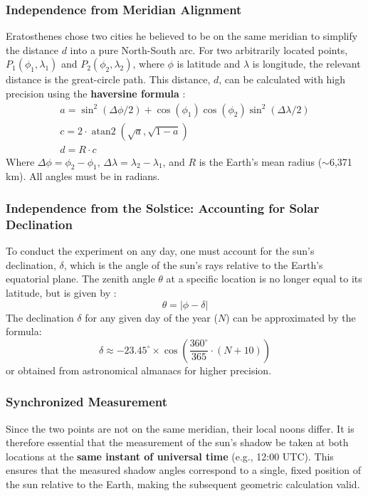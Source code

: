 \documentclass[11pt]{article}
\DeclareMathOperator{\atanS}{atan2}
\begin{document}
\subsubsection{Independence from Meridian Alignment}
Eratosthenes chose two cities he believed to be on the same meridian to simplify the distance $d$ into a pure North-South arc. For two arbitrarily located points, $P_1(\phi_1, \lambda_1)$ and $P_2(\phi_2, \lambda_2)$, where $\phi$ is latitude and $\lambda$ is longitude, the relevant distance is the great-circle path. This distance, $d$, can be calculated with high precision using the \textbf{haversine formula} \cite{Sinnott1984}:
\begin{gather}
    a = \sin^2(\Delta\phi/2) + \cos(\phi_1)\cos(\phi_2)\sin^2(\Delta\lambda/2) \label{eq:haversine_a} \\
    c = 2 \cdot \atanS(\sqrt{a}, \sqrt{1-a}) \label{eq:haversine_c} \\
    d = R \cdot c 
    \label{eq:haversine_d}
\end{gather}
Where $\Delta\phi = \phi_2 - \phi_1$, $\Delta\lambda = \lambda_2 - \lambda_1$, and $R$ is the Earth's mean radius ($\sim$6,371 km). All angles must be in radians.

\subsubsection{Independence from the Solstice: Accounting for Solar Declination}
To conduct the experiment on any day, one must account for the sun’s declination, $\delta$, which is the angle of the sun's rays relative to the Earth's equatorial plane. The zenith angle $\theta$ at a specific location is no longer equal to its latitude, but is given by \cite{Meeus1998}:
\begin{equation}
    \theta = |\phi - \delta|
    \label{eq:zenith_declination}
\end{equation}
The declination $\delta$ for any given day of the year ($N$) can be approximated by the formula:
\begin{equation}
    \delta \approx -23.45^{\circ} \times \cos\left( \frac{360^{\circ}}{365} \cdot (N + 10) \right)
    \label{eq:declination}
\end{equation}
or obtained from astronomical almanacs for higher precision.

\subsubsection{Synchronized Measurement}
Since the two points are not on the same meridian, their local noons differ. It is therefore essential that the measurement of the sun's shadow be taken at both locations at the \textbf{same instant of universal time} (e.g., 12:00 UTC). This ensures that the measured shadow angles correspond to a single, fixed position of the sun relative to the Earth, making the subsequent geometric calculation valid.
\end{document}
